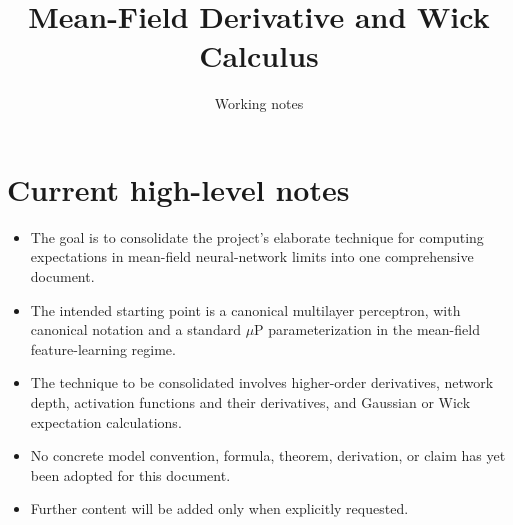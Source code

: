 \documentclass[11pt]{article}
\title{Mean-Field Derivative and Wick Calculus}
\author{Working notes}
\date{}
\begin{document}
\maketitle

\section*{Current high-level notes}

\begin{itemize}
  \item The goal is to consolidate the project's elaborate technique for
  computing expectations in mean-field neural-network limits into one
  comprehensive document.

  \item The intended starting point is a canonical multilayer perceptron,
  with canonical notation and a standard $\mu$P parameterization in the
  mean-field feature-learning regime.

  \item The technique to be consolidated involves higher-order derivatives,
  network depth, activation functions and their derivatives, and Gaussian or
  Wick expectation calculations.

  \item No concrete model convention, formula, theorem, derivation, or claim
  has yet been adopted for this document.

  \item Further content will be added only when explicitly requested.
\end{itemize}
\end{document}
